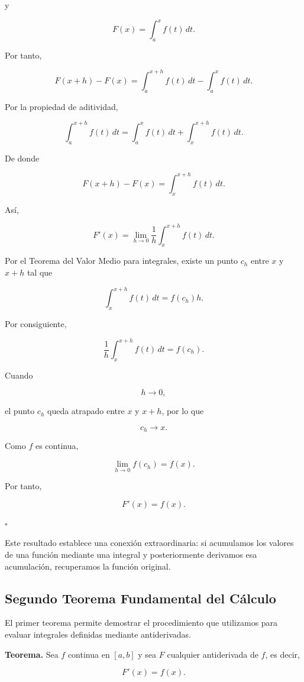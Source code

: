 \documentclass[12pt]{article}
\begin{document}
y

\[
F(x)
=
\int_a^x f(t)\,dt.
\]

Por tanto,

\[
F(x+h)-F(x)
=
\int_a^{x+h}f(t)\,dt
-
\int_a^x f(t)\,dt.
\]

Por la propiedad de aditividad,

\[
\int_a^{x+h}f(t)\,dt
=
\int_a^x f(t)\,dt
+
\int_x^{x+h}f(t)\,dt.
\]

De donde

\[
F(x+h)-F(x)
=
\int_x^{x+h}f(t)\,dt.
\]

Así,

\[
F'(x)
=
\lim_{h\to0}
\frac{1}{h}
\int_x^{x+h}f(t)\,dt.
\]

Por el Teorema del Valor Medio para integrales, existe un punto $c_h$
entre $x$ y $x+h$ tal que

\[
\int_x^{x+h}f(t)\,dt
=
f(c_h)h.
\]

Por consiguiente,

\[
\frac{1}{h}
\int_x^{x+h}f(t)\,dt
=
f(c_h).
\]

Cuando

\[
h\to0,
\]

el punto $c_h$ queda atrapado entre $x$ y $x+h$, por lo que

\[
c_h\to x.
\]

Como $f$ es continua,

\[
\lim_{h\to0}f(c_h)=f(x).
\]

Por tanto,

\[
\boxed{
F'(x)=f(x).
}
\]

\hfill$\square$

Este resultado establece una conexión extraordinaria: si acumulamos los
valores de una función mediante una integral y posteriormente derivamos
esa acumulación, recuperamos la función original.

\subsection{Segundo Teorema Fundamental del Cálculo}

El primer teorema permite demostrar el procedimiento que utilizamos para
evaluar integrales definidas mediante antiderivadas.

\textbf{Teorema.}
Sea $f$ continua en $[a,b]$ y sea $F$ cualquier antiderivada de $f$, es
decir,

\[
F'(x)=f(x).
\]
\end{document}
